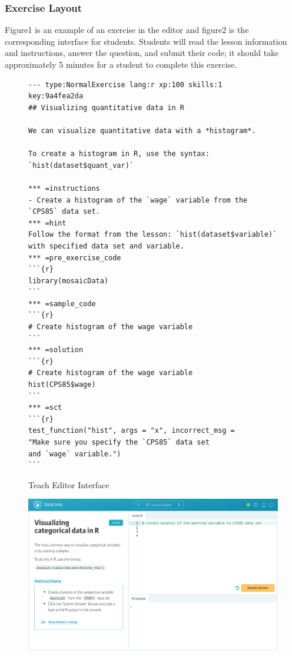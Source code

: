 \documentclass[12pt]{article}\usepackage[]{graphicx}\usepackage[]{color}
\begin{document}
\subsubsection{Exercise Layout}
Figure1 is an example of an exercise in the editor and figure2 is the corresponding interface for students. Students will read the lesson information and instructions, answer the question, and submit their code; it should take approximately 5 minutes for a student to complete this exercise.
\begin{figure}
\caption{Teach Editor Interface}
\begin{Verbatim}[frame=single]
--- type:NormalExercise lang:r xp:100 skills:1 key:9a4fea2da
## Visualizing quantitative data in R

We can visualize quantitative data with a *histogram*.

To create a histogram in R, use the syntax:
`hist(dataset$quant_var)`

*** =instructions
- Create a histogram of the `wage` variable from the 
`CPS85` data set.
*** =hint
Follow the format from the lesson: `hist(dataset$variable)`
with specified data set and variable.
*** =pre_exercise_code
```{r}
library(mosaicData)
```
*** =sample_code
```{r}
# Create histogram of the wage variable
```
*** =solution
```{r}
# Create histogram of the wage variable 
hist(CPS85$wage)
```
*** =sct
```{r}
test_function("hist", args = "x", incorrect_msg = 
"Make sure you specify the `CPS85` data set
and `wage` variable.")
```
\end{Verbatim}
\label{fig:code1}
\end{figure}

\begin{figure}[h]
  \includegraphics[scale = 0.40] {preview.jpg}
\end{figure}
\end{document}
